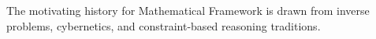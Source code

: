 The motivating history for Mathematical Framework is drawn from inverse problems, cybernetics, and constraint-based reasoning traditions.

